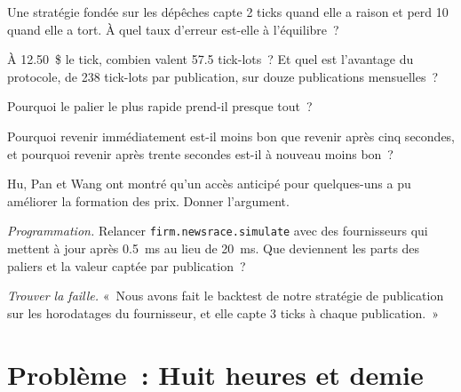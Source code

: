 \begin{exercise}[$\star$]\label{exo:hf:news-and-event-trading:2}
Une stratégie fondée sur les dépêches capte 2 ticks quand elle a raison et perd 10 quand elle a tort. À quel taux d'erreur est-elle à l'équilibre~?
\end{exercise}

\begin{exercise}[$\star$]\label{exo:hf:news-and-event-trading:3}
À 12.50~\$ le tick, combien valent 57.5 tick-lots~? Et quel est l'avantage du protocole, de 238 tick-lots par publication, sur douze publications mensuelles~?
\end{exercise}

\begin{exercise}[$\star\star$]\label{exo:hf:news-and-event-trading:4}
Pourquoi le palier le plus rapide prend-il presque tout~?
\end{exercise}

\begin{exercise}[$\star\star$]\label{exo:hf:news-and-event-trading:5}
Pourquoi revenir immédiatement est-il moins bon que revenir après cinq secondes, et pourquoi revenir après trente secondes est-il à nouveau moins bon~?
\end{exercise}

\begin{exercise}[$\star\star$]\label{exo:hf:news-and-event-trading:6}
Hu, Pan et Wang ont montré qu'un accès anticipé pour quelques-uns a pu améliorer la formation des prix. Donner l'argument.
\end{exercise}

\begin{exercise}[$\star\star\star$]\label{exo:hf:news-and-event-trading:7}
\emph{Programmation.} Relancer \texttt{firm.newsrace.simulate} avec des fournisseurs qui mettent à jour après 0.5~ms au lieu de 20~ms. Que deviennent les parts des paliers et
la valeur captée par publication~?
\end{exercise}

\begin{exercise}[$\star\star\star$]\label{exo:hf:news-and-event-trading:8}
\emph{Trouver la faille.} «~Nous avons fait le backtest de notre stratégie de publication sur les horodatages du fournisseur, et elle capte 3 ticks à chaque publication.~»
\end{exercise}

\section{Problème~: Huit heures et demie}

